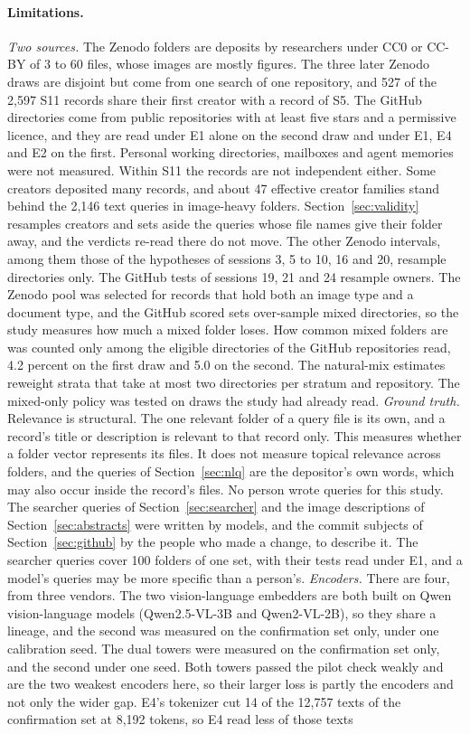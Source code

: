 \documentclass[11pt]{article}
\begin{document}
\paragraph{Limitations.} \emph{Two sources.} The Zenodo folders are deposits by researchers under CC0 or CC-BY of 3 to 60 files, whose images are mostly figures. The three later Zenodo draws are disjoint but come from one search of one repository, and 527 of the 2,597 S11 records share their first creator with a record of S5. The GitHub directories come from public repositories with at least five stars and a permissive licence, and they are read under E1 alone on the second draw and under E1, E4 and E2 on the first. Personal working directories, mailboxes and agent memories were not measured. Within S11 the records are not independent either. Some creators deposited many records, and about 47 effective creator families stand behind the 2,146 text queries in image-heavy folders. Section~\ref{sec:validity} resamples creators and sets aside the queries whose file names give their folder away, and the verdicts re-read there do not move. The other Zenodo intervals, among them those of the hypotheses of sessions 3, 5 to 10, 16 and 20, resample directories only. The GitHub tests of sessions 19, 21 and 24 resample owners. The Zenodo pool was selected for records that hold both an image type and a document type, and the GitHub scored sets over-sample mixed directories, so the study measures how much a mixed folder loses. How common mixed folders are was counted only among the eligible directories of the GitHub repositories read, 4.2 percent on the first draw and 5.0 on the second. The natural-mix estimates reweight strata that take at most two directories per stratum and repository. The mixed-only policy was tested on draws the study had already read. \emph{Ground truth.} Relevance is structural. The one relevant folder of a query file is its own, and a record's title or description is relevant to that record only. This measures whether a folder vector represents its files. It does not measure topical relevance across folders, and the queries of Section~\ref{sec:nlq} are the depositor's own words, which may also occur inside the record's files. No person wrote queries for this study. The searcher queries of Section~\ref{sec:searcher} and the image descriptions of Section~\ref{sec:abstracts} were written by models, and the commit subjects of Section~\ref{sec:github} by the people who made a change, to describe it. The searcher queries cover 100 folders of one set, with their tests read under E1, and a model's queries may be more specific than a person's. \emph{Encoders.} There are four, from three vendors. The two vision-language embedders are both built on Qwen vision-language models (Qwen2.5-VL-3B and Qwen2-VL-2B), so they share a lineage, and the second was measured on the confirmation set only, under one calibration seed. The dual towers were measured on the confirmation set only, and the second under one seed. Both towers passed the pilot check weakly and are the two weakest encoders here, so their larger loss is partly the encoders and not only the wider gap. E4's tokenizer cut 14 of the 12,757 texts of the confirmation set at 8,192 tokens, so E4 read less of those texts 
\end{document}
